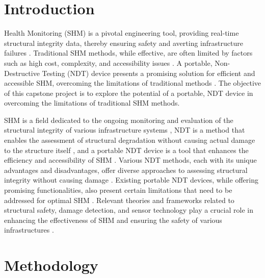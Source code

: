 \documentclass[journal, a4paper]{IEEEtran}
\begin{document}
\section{Introduction}
 Health Monitoring (SHM) is a pivotal engineering tool, providing real-time structural integrity data,
thereby ensuring safety and averting infrastructure failures \cite{Gharehbaghi2022} \cite{Katam2023}.
Traditional SHM methods, while effective, are often limited by factors such as
high cost, complexity, and accessibility issues \cite{Katam2023} \cite{Gharehbaghi2022}.
A portable, Non-Destructive Testing (NDT) device presents a promising solution for efficient and accessible SHM,
overcoming the limitations of traditional methods \cite{Guo2022} \cite{Chen2023}.
The objective of this capstone project is to explore the potential of a portable,
NDT device in overcoming the limitations of traditional SHM methods.

SHM is a field dedicated to the ongoing monitoring and evaluation of the structural integrity
of various infrastructure systems \cite{Katam2023}, NDT is a method that enables the assessment
of structural degradation without causing actual damage to the structure itself \cite{Katam2023},
and a portable NDT device is a tool that enhances the efficiency and accessibility of SHM \cite{Hassani2023} \cite{Katam2023}.
Various NDT methods, each with its unique advantages and disadvantages,
offer diverse approaches to assessing structural integrity without causing damage \cite{Dolati2021} \cite{Verma2013}.
Existing portable NDT devices, while offering promising functionalities,
also present certain limitations that need to be addressed for optimal SHM \cite{Hassani2023} \cite{Zhu2011}.
Relevant theories and frameworks related to structural safety, damage detection,
and sensor technology play a crucial role in enhancing the effectiveness of SHM
and ensuring the safety of various infrastructures \cite{Chen2021} \cite{Gharehbaghi2022}.


\section{Methodology}
\lipsum[1]
\end{document}
